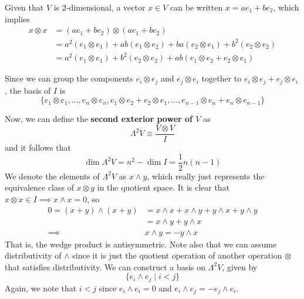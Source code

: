   \begin{example}
  Given that $V$ is 2-dimensional, a vector $x \in V$ can be written $x = a e_1 + b e_2$, which implies
  \begin{align*}
      x \otimes x & = (a e_1 + b e_2) \otimes (a e_1 + b e_2) \\
      & = a^2 (e_1 \otimes e_1) + a b (e_1 \otimes e_2) + b a (e_2 \otimes e_1) + b^2 (e_2 \otimes e_2) \\
      & = a^2 (e_1 \otimes e_1) + b^2 (e_2 \otimes e_2) + a b (e_1 \otimes e_2 + e_2 \otimes e_1) 
  \end{align*}
  \end{example}

  Since we can group the components $e_i \otimes e_j$ and $e_j \otimes e_i$ together to $e_i \otimes e_j + e_j \otimes e_i$, the basis of $I$ is 
  \[\{e_1 \otimes e_1, ..., e_n \otimes e_n, e_1 \otimes e_2 + e_2 \otimes e_1, ..., e_{n-1} \otimes e_n + e_n \otimes e_{n-1}\}\]

  \begin{definition}
  Now, we can define the \textbf{second exterior power of $V$} as
  \[\Lambda^2 V \equiv \frac{V \otimes V}{I}\]
  and it follows that 
  \[\dim{\Lambda^2 V} = n^2 - \dim{I} = \frac{1}{2} n (n-1)\]
  We denote the elements of $\Lambda^2 V$ as $x \wedge y$, which really just represents the equivalence class of $x \otimes y$ in the quotient space. It is clear that $x \otimes x \in I \implies x \wedge x = 0$, so
  \begin{align*}
      0 = (x + y) \wedge (x + y) & = x \wedge x + x \wedge y + y \wedge x + y \wedge y \\
      & = x \wedge y + y \wedge x \\
      \implies & x \wedge y = - y \wedge x
  \end{align*}
  That is, the wedge product is antisymmetric. Note also that we can assume distributivity of $\wedge$ since it is just the quotient operation of another operation $\otimes$ that satisfies distributivity. We can construct a basis on $\Lambda^2 V$, given by 
  \[\{e_i \wedge e_j \; | \; i < j\}\]
  Again, we note that $i < j$ since $e_i \wedge e_i = 0$ and $e_i \wedge e_j = - e_j \wedge e_i$. 
  \end{definition}

